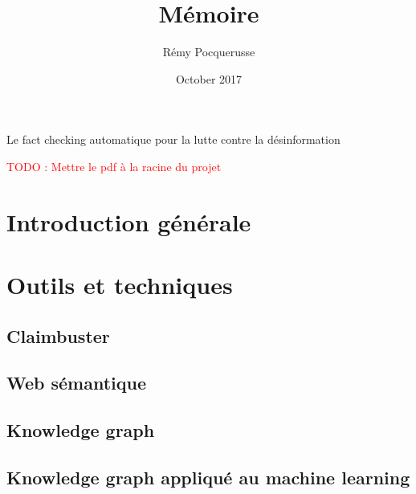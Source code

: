 \documentclass[12pt]{article}
\title{Mémoire}
\author{Rémy Pocquerusse}
\date{October 2017}
\newcommand\todo[1]{\textcolor{red}{TODO : #1}}
\begin{document}
\maketitle

\par\hfil\null\par
\par\hfil\null\par
\par\hfil\null\par

\begin{center}
{\huge Le fact checking automatique pour la lutte contre la désinformation}
\end{center}

\clearpage

\renewcommand*\contentsname{Sommaire}

\clearpage

\tableofcontents

\clearpage

\todo{Mettre le pdf à la racine du projet}

\section{Introduction générale}



\section{Outils et techniques}

\subsection{Claimbuster}



\subsection{Web sémantique}



\subsection{Knowledge graph}
\label{section_knowledge_graph}



\subsection{Knowledge graph appliqué au machine learning}
\end{document}

